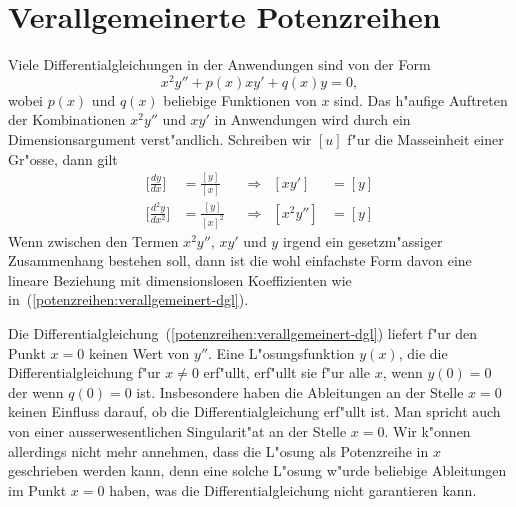 \section{Verallgemeinerte Potenzreihen
\label{section:potenzreihen:verallgemeinert}}
Viele Differentialgleichungen in der Anwendungen sind von der Form
\begin{equation}
x^2y''+p(x)xy'+q(x)y=0,
\label{potenzreihen:verallgemeinert-dgl}
\end{equation}
wobei $p(x)$ und $q(x)$ beliebige Funktionen von $x$ sind.
Das h"aufige Auftreten der Kombinationen $x^2y''$ und $xy'$ in Anwendungen
wird durch ein Dimensionsargument verst"andlich.
Schreiben wir $[u]$ f"ur die Masseinheit einer Gr"osse, dann gilt
\begin{equation*}
\begin{aligned}
\biggl[\frac{dy}{dx}\biggr]
&=
\frac{[y]}{[x]}
&
&\Rightarrow&
[xy']&=[y]\\
\biggl[\frac{d^2y}{dx^2}\biggr]
&=
\frac{[y]}{[x]^2}
&
&\Rightarrow&
[x^2y'']&=[y]
\end{aligned}
\end{equation*}
Wenn zwischen den Termen $x^2y''$, $xy'$ und $y$ irgend ein
gesetzm"assiger Zusammenhang bestehen soll, dann ist die wohl
einfachste Form davon eine lineare Beziehung mit dimensionslosen
Koeffizienten wie in~(\ref{potenzreihen:verallgemeinert-dgl}).

Die Differentialgleichung~(\ref{potenzreihen:verallgemeinert-dgl})
liefert f"ur den Punkt $x=0$ keinen Wert von $y''$.
Eine L"osungsfunktion $y(x)$, die die Differentialgleichung f"ur
$x\ne 0$ erf"ullt, erf"ullt sie f"ur alle $x$, wenn $y(0)=0$ der
wenn $q(0)=0$ ist. 
Insbesondere haben die Ableitungen an der Stelle $x=0$ keinen
Einfluss darauf, ob die Differentialgleichung erf"ullt ist.
Man spricht auch von einer ausserwesentlichen Singularit"at an
der Stelle $x=0$.
Wir k"onnen allerdings nicht mehr annehmen, dass die L"osung als
Potenzreihe in $x$ geschrieben werden kann, denn eine solche
L"osung w"urde beliebige Ableitungen im Punkt $x=0$ haben, was 
die Differentialgleichung nicht garantieren kann.

